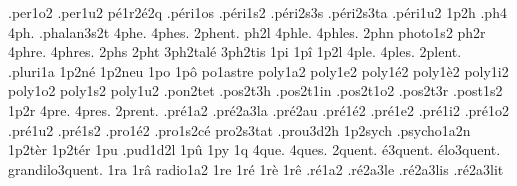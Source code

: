 {                    .per1o2
                    .per1u2
                    pé1r2é2q %
                    .péri1os
                    .péri1s2
                    .péri2s3s
                    .péri2s3ta
                    .péri1u2
1p2h
.ph4
4ph.
                    .phalan3s2t
4phe.
4phes.
2phent. %
ph2l
4phle.
4phles.
2phn
                    photo1s2
ph2r
4phre.
4phres.
2phs
2pht
                    3ph2talé
                    3ph2tis
1pi
1pî
1p2l
4ple.
4ples.
2plent. %
                    .pluri1a
                    1p2né
                    1p2neu
1po
1pô
                    po1astre
                    poly1a2
                    poly1e2
                    poly1é2
                    poly1è2
                    poly1i2
                    poly1o2
                    poly1s2
                    poly1u2
                    .pon2tet %
                    .pos2t3h
                    .pos2t1in
                    .pos2t1o2
                    .pos2t3r
                    .post1s2
1p2r
4pre.
4pres.
2prent. %
                    .pré1a2
                    .pré2a3la %
                    .pré2au
                    .pré1é2
                    .pré1e2
                    .pré1i2
                    .pré1o2
                    .pré1u2
                    .pré1s2
                    .pro1é2
                    .pro1s2cé
                    pro2s3tat
                    .prou3d2h
                    1p2sych
                    .psycho1a2n
                    1p2tèr
                    1p2tér
1pu
                    .pud1d2l
1pû
1py
1q
4que.
4ques.
        2quent.
     é3quent.
   élo3quent.
grandilo3quent.
1ra
1râ
                    radio1a2 %
1re
1ré
1rè
1rê
                    .ré1a2
                    .ré2a3le
                    .ré2a3lis
                    .ré2a3lit
}
